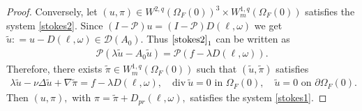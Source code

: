 \documentclass[12pt,a4paper,reqno]{amsart}
\theoremstyle{definition}
\theoremstyle{remark}
\numberwithin{equation}{section}
\newcommand{\ofo}{\Omega_{F}(0)}
\newcommand{\mpp}{\mathcal{P}}
\begin{document}
\begin{proof}
Conversely,  let  $(u,\pi) \in W^{2,q}(\ofo)^{3} \times W^{1,q}_{m}(\ofo)$ satisfies the system \eqref{stokes2}. Since $(I - \mpp)u = (I - \mpp) D(\ell, \omega)$ we get $\widetilde u : = u - D(\ell, \omega) \in \mathcal{D}(A_{0}).$ Thus $\eqref{stokes2}_{1}$ can be written as
\begin{align*}
\mpp \left( \lambda \widetilde u - A_{0} \widetilde u \right) = \mpp ( f - \lambda D(\ell,\omega)).
\end{align*}
Therefore, there exists $\widetilde \pi \in W^{1,q}_{m}(\ofo)$ such that $(\widetilde u, \widetilde \pi)$ satisfies
\begin{align*}
\lambda \widetilde u - \nu \Delta \widetilde u + \nabla \widetilde \pi = f - \lambda D(\ell, \omega), \quad \mathrm{div} \ \widetilde u = 0 \mbox{ in } \ofo,  \quad \widetilde u = 0 \mbox{ on } \partial \ofo.
\end{align*}
Then $(u, \pi),$ with $\pi = \widetilde \pi +D_{pr} (\ell, \omega),$ satisfies the system \eqref{stokes1}.
\end{proof}
\end{document}
